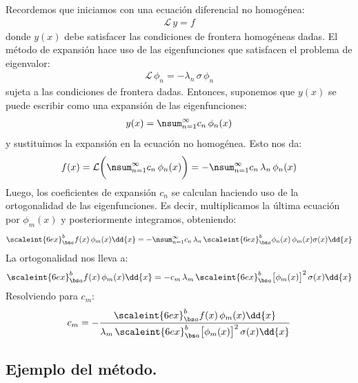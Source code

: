 Recordemos que iniciamos con una ecuación diferencial no homogénea:
\begin{align*}
\mathcal{L} \, y = f
\end{align*}
donde $y (x)$ debe satisfacer las condiciones de frontera homogéneas dadas. El método de expansión hace uso de las eigenfunciones que satisfacen el problema de eigenvalor:
\begin{align*}
\mathcal{L} \, \phi_{n} = - \lambda_{n} \, \sigma \, \phi_{n}
\end{align*}
sujeta a las condiciones de frontera dadas. Entonces, suponemos que $y (x)$ se puede escribir como una expansión de las eigenfunciones:
\begin{align*}
y (x) = \nsum_{n=1}^{\infty} c_{n} \, \phi_{n} (x)
\end{align*}
y sustituimos la expansión en la ecuación no homogénea. Esto nos da:
\begin{align*}
f (x) = \mathcal{L} \bigg( \nsum_{n=1}^{\infty} c_{n} \, \phi_{n} (x) \bigg) = - \nsum_{n=1}^{\infty} c_{n} \, \lambda_{n} \, \phi_{n} (x)
\end{align*}
Luego, los coeficientes de expansión $c_{n}$ se calculan haciendo uso de la ortogonalidad de las eigenfunciones. Es decir, multiplicamos la última ecuación por $\phi_{m} (x)$ y posteriormente integramos, obteniendo:
\begin{align*}
\scaleint{6ex}_{\bs a}^{b} f (x) \, \phi_{m} (x) \dd{x} = - \nsum_{n=1}^{\infty} c_{n} \, \lambda_{n} \, \scaleint{6ex}_{\bs a}^{b} \phi_{n} (x) \, \phi_{m} (x) \sigma (x) \dd{x}
\end{align*}
La ortogonalidad nos lleva a:
\begin{align*}
\scaleint{6ex}_{\bs a}^{b} f (x) \, \phi_{m} (x) \dd{x} = - c_{m} \, \lambda_{m} \, \scaleint{6ex}_{\bs a}^{b} \big[ \phi_{m} (x) \big]^{2} \, \sigma (x) \dd{x}
\end{align*}
Resolviendo para $c_{m}$:
\begin{align*}
c_{m} = - \dfrac{\scaleint{6ex}_{\bs a}^{b} f (x) \, \phi_{m} (x) \dd{x}}{\lambda_{m} \, \scaleint{6ex}_{\bs a}^{b} \big[ \phi_{m} (x) \big]^{2} \, \sigma (x) \dd{x}}
\end{align*}

\subsection{Ejemplo del método.}

